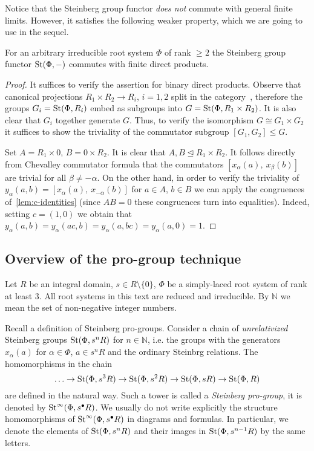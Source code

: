\documentclass[oneside, 11pt]{amsart} \pdfoutput=1
\begin{document}
Notice that the Steinberg group functor {\it does not} commute with general finite limits. However, it satisfies the following weaker property, which we are going to use in the sequel.
\begin{lemma} \label{lem:fprod} For an arbitrary irreducible root system $\Phi$ of rank $\geq 2$ the Steinberg group functor $\mathop{\mathrm{St}}\nolimits(\Phi, -)$ commutes with finite direct products. \end{lemma}
\begin{proof} 
It suffices to verify the assertion for binary direct products.
Observe that canonical projections $R_1 \times R_2 \to R_i$, $i=1,2$ split in the category~, therefore the groups $G_i = \mathop{\mathrm{St}}\nolimits(\Phi, R_i)$ embed as subgroups into $G = \mathop{\mathrm{St}}\nolimits(\Phi, R_1 \times R_2)$. It is also clear that $G_i$ together generate $G$. Thus, to verify the isomorphism $G \cong G_1 \times G_2$ it suffices to show the triviality of the commutator subgroup $[G_1, G_2] \leq G$.

Set $A = R_1\times 0$, $B = 0 \times R_2$. It is clear that $A, B \trianglelefteq R_1 \times R_2$. 
It follows directly from Chevalley commutator formula that the commutators $[x_{\alpha}(a),\ x_\beta(b)]$ are trivial for all $\beta \neq -\alpha$. On the other hand, in order to verify the triviality of $y_\alpha(a, b) = [x_{\alpha}(a),\ x_{-\alpha}(b)]$ for $a\in A$, $b\in B$ we can apply the congruences of~\cref{lem:c-identities} (since $AB=0$ these congruences turn into equalities).
Indeed, setting $c = (1, 0)$ we obtain that $y_\alpha(a, b) = y_\alpha(ac, b) = y_\alpha(a, bc) = y_\alpha(a, 0) = 1$. \end{proof}

\subsection{Overview of the pro-group technique}
Let $R$ be an integral domain, $s \in R \setminus \{0\}$, $\Phi$ be a simply-laced root system of rank at least $3$. All root systems in this text are reduced and irreducible. By \(\mathbb N\) we mean the set of non-negative integer numbers.

Recall a definition of Steinberg pro-groups. Consider a chain of {\it unrelativized} Steinberg groups $\mathop{\mathrm{St}}\nolimits(\Phi, s^n R)$ for $n \in \mathbb N$, i.e. the groups with the generators $x_{\alpha}(a)$ for $\alpha \in \Phi$, $a \in s^n R$ and the ordinary Steinbrg relations. The homomorphisms in the chain
$$
\ldots \to \mathop{\mathrm{St}}\nolimits(\Phi, s^3 R) \to \mathop{\mathrm{St}}\nolimits(\Phi, s^2 R) \to \mathop{\mathrm{St}}\nolimits(\Phi, s R) \to \mathop{\mathrm{St}}\nolimits(\Phi, R)
$$
are defined in the natural way. Such a tower is called a {\it Steinberg pro-group}, it is denoted by $\mathop{\mathrm{St}}\nolimits^\infty(\Phi, s^\bullet R)$. We usually do not write explicitly the structure homomorphisms of $\mathop{\mathrm{St}}\nolimits^\infty(\Phi, s^\bullet R)$ in diagrams and formulas. In particular, we denote the elements of $\mathop{\mathrm{St}}\nolimits(\Phi, s^n R)$ and their images in $\mathop{\mathrm{St}}\nolimits(\Phi, s^{n - 1} R)$ by the same letters.
\end{document}
